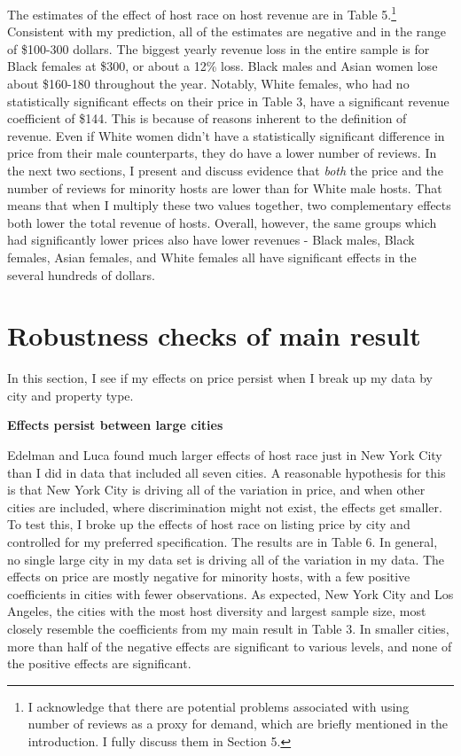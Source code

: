\documentclass[11pt, oneside]{article}
\begin{document}
The estimates of the effect of host race on host revenue are in Table 5.\footnote{I acknowledge that there are potential problems associated with using number of reviews as a proxy for demand, which are briefly mentioned in the introduction. I fully discuss them in Section 5.} Consistent with my prediction, all of the estimates are negative and in the range of \$100-300 dollars. The biggest yearly revenue loss in the entire sample is for Black females at \$300, or about a 12\% loss. Black males and Asian women lose about \$160-180 throughout the year. Notably, White females, who had no statistically significant effects on their price in Table 3, have a significant revenue coefficient of \$144. This is because of reasons inherent to the definition of revenue. Even if White women didn't have a statistically significant difference in price from their male counterparts, they do have a lower number of reviews. In the next two sections, I present and discuss evidence that \textit{both} the price and the number of reviews for minority hosts are lower than for White male hosts. That means that when I multiply these two values together, two complementary effects both lower the total revenue of hosts. Overall, however, the same groups which had significantly lower prices also have lower revenues - Black males, Black females, Asian females, and White females all have significant effects in the several hundreds of dollars. 
 


\section{Robustness checks of main result} %

In this section, I see if my effects on price persist when I break up my data by city and property type. 

\textbf{Effects persist between large cities}

Edelman and Luca found much larger effects of host race just in New York City than I did in data that included all seven cities. A reasonable hypothesis for this is that New York City is driving all of the variation in price, and when other cities are included, where discrimination might not exist, the effects get smaller. To test this, I broke up the effects of host race on listing price by city and controlled for my preferred specification. The results are in Table 6. In general, no single large city in my data set is driving all of the variation in my data. The effects on price are mostly negative for minority hosts, with a few positive coefficients in cities with fewer observations. As expected, New York City and Los Angeles, the cities with the most host diversity and largest sample size, most closely resemble the coefficients from my main result in Table 3. In smaller cities, more than half of the negative effects are significant to various levels, and none of the positive effects are significant. 
\end{document}
